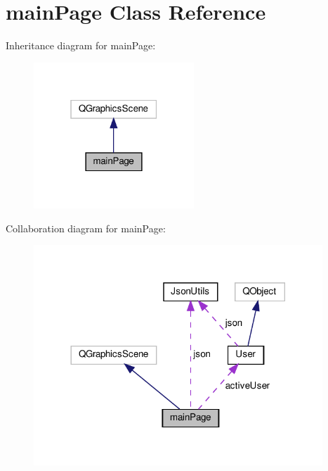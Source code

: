 \hypertarget{classmainPage}{}\section{main\+Page Class Reference}
\label{classmainPage}


Inheritance diagram for main\+Page\+:
\nopagebreak
\begin{figure}[H]
\begin{center}
\leavevmode
\includegraphics[width=171pt]{classmainPage__inherit__graph}
\end{center}
\end{figure}


Collaboration diagram for main\+Page\+:
\nopagebreak
\begin{figure}[H]
\begin{center}
\leavevmode
\includegraphics[width=308pt]{classmainPage__coll__graph}
\end{center}
\end{figure}

